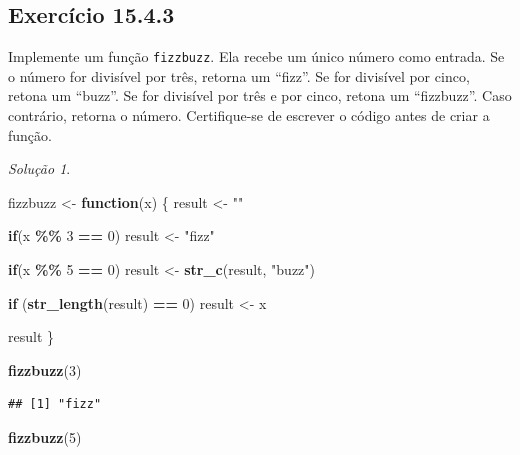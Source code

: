 \documentclass[
]{latex/krantz}
\newenvironment{Shaded}{\begin{snugshade}}{\end{snugshade}}
\newcommand{\ControlFlowTok}[1]{\textcolor[rgb]{0.13,0.29,0.53}{\textbf{#1}}}
\newcommand{\DecValTok}[1]{\textcolor[rgb]{0.00,0.00,0.81}{#1}}
\newcommand{\FunctionTok}[1]{\textcolor[rgb]{0.13,0.29,0.53}{\textbf{#1}}}
\newcommand{\NormalTok}[1]{#1}
\newcommand{\OtherTok}[1]{\textcolor[rgb]{0.56,0.35,0.01}{#1}}
\newcommand{\SpecialCharTok}[1]{\textcolor[rgb]{0.81,0.36,0.00}{\textbf{#1}}}
\newcommand{\StringTok}[1]{\textcolor[rgb]{0.31,0.60,0.02}{#1}}
\theoremstyle{definition}
\theoremstyle{definition}
\theoremstyle{definition}
\theoremstyle{definition}
\theoremstyle{remark}
\newtheorem*{solution}{Solução}
\begin{document}
\hypertarget{exr15-4-3}{%
\subsection*{Exercício 15.4.3}\label{exr15-4-3}}

Implemente um função \texttt{fizzbuzz}. Ela recebe um único número como entrada. Se o número for divisível por três, retorna um ``fizz''. Se for divisível por cinco, retona um ``buzz''. Se for divisível por três e por cinco, retona um ``fizzbuzz''. Caso contrário, retorna o número. Certifique-se de escrever o código antes de criar a função.

\begin{solution}
\leavevmode

\begin{Shaded}
\begin{Highlighting}[]
\NormalTok{fizzbuzz }\OtherTok{\textless{}{-}} \ControlFlowTok{function}\NormalTok{(x) \{}
\NormalTok{  result }\OtherTok{\textless{}{-}} \StringTok{""}

  \ControlFlowTok{if}\NormalTok{(x }\SpecialCharTok{\%\%} \DecValTok{3} \SpecialCharTok{==} \DecValTok{0}\NormalTok{)}
\NormalTok{    result }\OtherTok{\textless{}{-}} \StringTok{"fizz"}

  \ControlFlowTok{if}\NormalTok{(x }\SpecialCharTok{\%\%} \DecValTok{5} \SpecialCharTok{==} \DecValTok{0}\NormalTok{)}
\NormalTok{    result }\OtherTok{\textless{}{-}} \FunctionTok{str\_c}\NormalTok{(result, }\StringTok{"buzz"}\NormalTok{)}

  \ControlFlowTok{if}\NormalTok{ (}\FunctionTok{str\_length}\NormalTok{(result) }\SpecialCharTok{==} \DecValTok{0}\NormalTok{)}
\NormalTok{    result }\OtherTok{\textless{}{-}}\NormalTok{ x}

\NormalTok{  result}
\NormalTok{\}}

\FunctionTok{fizzbuzz}\NormalTok{(}\DecValTok{3}\NormalTok{)}
\end{Highlighting}
\end{Shaded}

\begin{verbatim}
## [1] "fizz"
\end{verbatim}

\begin{Shaded}
\begin{Highlighting}[]
\FunctionTok{fizzbuzz}\NormalTok{(}\DecValTok{5}\NormalTok{)}
\end{Highlighting}
\end{Shaded}


\end{solution}
\end{document}
